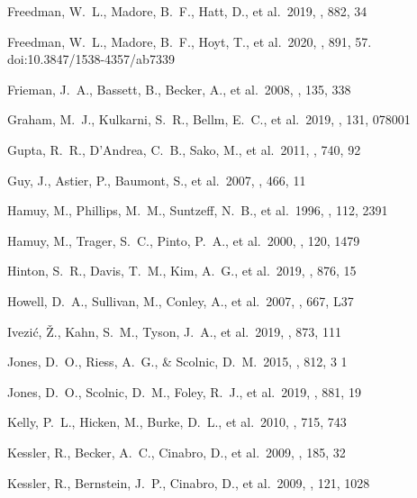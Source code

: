 \documentclass[]{aa}
\begin{document}
\begin{thebibliography}{}
 Freedman, W.~L., Madore, B.~F.,
Hatt, D., et al.\ 2019, \apj, 882, 34

 Freedman, W.~L., Madore, B.~F.,
Hoyt, T., et al.\ 2020, \apj, 891, 57. doi:10.3847/1538-4357/ab7339

 Frieman, J.~A., Bassett, B., Becker,
A., et al.\ 2008, \aj, 135, 338


 Graham, M.~J., Kulkarni, S.~R., Bellm,
E.~C., et al.\ 2019, \pasp, 131, 078001

 Gupta, R.~R., D'Andrea, C.~B., Sako, M.,
et al.\ 2011, \apj, 740, 92

 Guy, J., Astier, P., Baumont, S., et al.\
2007, \aap, 466, 11


 Hamuy, M., Phillips, M.~M., Suntzeff,
N.~B., et al.\ 1996, \aj, 112, 2391

 Hamuy, M., Trager, S.~C., Pinto, P.~A.,
et al.\ 2000, \aj, 120, 1479

 Hinton, S.~R., Davis, T.~M., Kim,
A.~G., et al.\ 2019, \apj, 876, 15

 Howell, D.~A., Sullivan, M., Conley,
A., et al.\ 2007, \apjl, 667, L37


 Ivezi{\'c}, {\v{Z}}., Kahn, S.~M.,
Tyson, J.~A., et al.\ 2019, \apj, 873, 111


 Jones, D.~O., Riess, A.~G., \& Scolnic,
D.~M.\ 2015, \apj, 812, 3 1

 Jones, D.~O., Scolnic, D.~M., Foley,
R.~J., et al.\ 2019, \apj, 881, 19


 Kelly, P.~L., Hicken, M., Burke, D.~L.,
et al.\ 2010, \apj, 715, 743

 Kessler, R., Becker, A.~C., Cinabro,
D., et al.\ 2009, \apjs, 185, 32

 Kessler, R., Bernstein, J.~P., Cinabro,
D., et al.\ 2009, \pasp, 121, 1028


\end{thebibliography}
\end{document}
